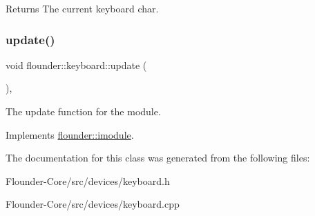 \begin{DoxyReturn}{Returns}
The current keyboard char. 
\end{DoxyReturn}
\mbox{\label{classflounder_1_1keyboard_a9fe79eabe905466fd90413d2c3b68841}} 
\subsubsection{\texorpdfstring{update()}{update()}}
{\footnotesize\ttfamily void flounder\+::keyboard\+::update (\begin{DoxyParamCaption}{ }\end{DoxyParamCaption})\hspace{0.3cm}{\ttfamily [override]}, {\ttfamily [virtual]}}



The update function for the module. 



Implements \hyperlink{classflounder_1_1imodule_a9a53d48a46b5f6b16a92b2cd8503f74a}{flounder\+::imodule}.



The documentation for this class was generated from the following files\+:\begin{DoxyCompactItemize}
\item 
Flounder-\/\+Core/src/devices/keyboard.\+h\item 
Flounder-\/\+Core/src/devices/keyboard.\+cpp\end{DoxyCompactItemize}
